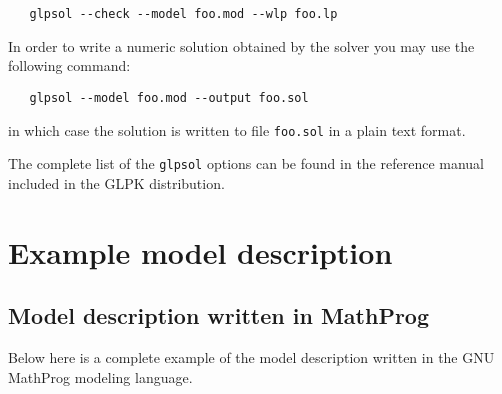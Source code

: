 \documentclass[10pt]{article}
\begin{document}
\medskip

\verb|   glpsol --check --model foo.mod --wlp foo.lp|

\medskip

In order to write a numeric solution obtained by the solver you may use
the following command:

\medskip

\verb|   glpsol --model foo.mod --output foo.sol|

\medskip

\noindent in which case the solution is written to file \verb|foo.sol|
in a plain text format.

The complete list of the \verb|glpsol| options can be found in the
reference manual included in the GLPK distribution.


\newpage

\section{Example model description}

\subsection{Model description written in MathProg}

Below here is a complete example of the model description written in
the GNU MathProg modeling language.
\end{document}
